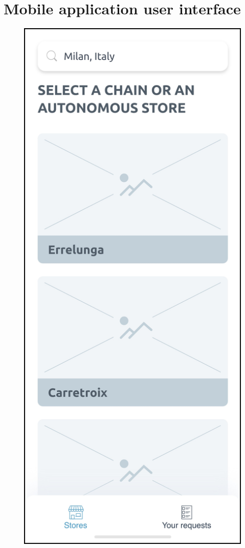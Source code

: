 \documentclass[a4paper,oneside,11pt]{book}
\begin{document}
    \section{Mobile application user interface}
    \begin{multicols}{2}
        \begin{figure}[H]
            \centering
            \includegraphics[width=\textwidth, height=.55\textheight, keepaspectratio]{pictures/mockups/select_chain}

\end{figure}
\end{multicols}
\end{document}
